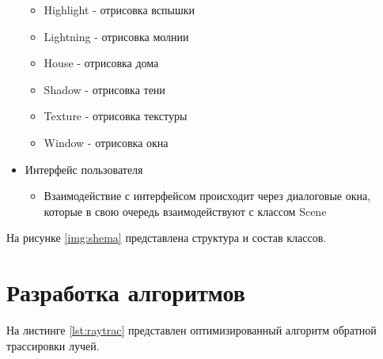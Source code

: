 \begin{itemize}
	\begin{itemize}
		\item Highlight - отрисовка вспышки
		\item Lightning - отрисовка молнии
		\item House - отрисовка дома
		\item Shadow - отрисовка тени
		\item Texture - отрисовка текстуры
		\item Window - отрисовка окна
	\end{itemize}
	\item Интерфейс пользователя
	\begin{itemize}
		\item Взаимодействие с интерфейсом происходит через диалоговые окна, которые в свою очередь взаимодействуют с классом Scene
	\end{itemize}	
\end{itemize}

На рисунке \ref{img:shema} представлена структура и состав классов.

\clearpage

\section{Разработка алгоритмов}
На листинге \ref{lst:raytrac} представлен оптимизированный алгоритм обратной трассировки лучей.


